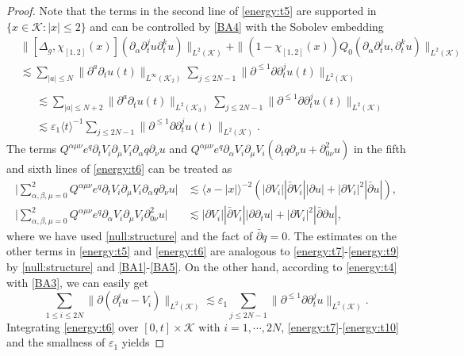 \documentclass[11pt,twoside]{article}
\def\cK{\mathcal K}
\def\p{\partial}
\def\ve{\varepsilon}
\def\ls{\lesssim}
\newcommand{\w}[1]{\langle {#1} \rangle}
\theoremstyle{plain}
\theoremstyle{definition}
\numberwithin{equation}{section}
\begin{document}
\begin{proof}
Note that the terms in the second line of \eqref{energy:t5} are supported in $\{x\in\cK:|x|\le2\}$ and
can be controlled by \eqref{BA4} with the Sobolev embedding
\begin{equation*}\label{energy:t8}
\begin{split}
&\|[\Delta_g,\chi_{[1,2]}(x)](\p_{\alpha}\p_t^ju\p_t^ku)\|_{L^2(\cK)}+\|(1-\chi_{[1,2]}(x))Q_0(\p_{\alpha}\p_t^ju,\p_t^ku)\|_{L^2(\cK)}\\
&\ls\sum_{|a|\le N}\|\p^a\p_tu(t)\|_{L^\infty(\cK_2)}\sum_{j\le2N-1}\|\p^{\le1}\p\p_t^ju(t)\|_{L^2(\cK)}\\
\end{split}
\end{equation*}
\begin{equation}\label{energy:t8}
\begin{split}
&\ls\sum_{|a|\le N+2}\|\p^a\p_tu(t)\|_{L^2(\cK_3)}\sum_{j\le2N-1}\|\p^{\le1}\p\p_t^ju(t)\|_{L^2(\cK)}\\
&\ls\ve_1\w{t}^{-1}\sum_{j\le2N-1}\|\p^{\le1}\p\p_t^ju(t)\|_{L^2(\cK)}.
\end{split}
\end{equation}
The terms $Q^{\alpha\mu\nu}e^q\p_tV_i\p_{\mu}V_i\p_{\alpha}q\p_{\nu}u$ and
$Q^{\alpha\mu\nu}e^q\p_{\alpha}V_i\p_{\mu}V_i(\p_tq\p_{\nu}u+\p^2_{0\nu}u)$ in the fifth and
sixth lines of \eqref{energy:t6} can be treated as
\begin{equation}\label{energy:t9}
\begin{split}
\Big|\sum_{\alpha,\beta,\mu=0}^2Q^{\alpha\mu\nu}e^q\p_tV_i\p_{\mu}V_i\p_{\alpha}q\p_{\nu}u\Big|
&\ls\w{s-|x|}^{-2}(|\p V_i||\bar\p V_i||\p u|+|\p V_i|^2|\bar\p u|),\\
\Big|\sum_{\alpha,\beta,\mu=0}^2Q^{\alpha\mu\nu}e^q\p_{\alpha}V_i\p_{\mu}V_i\p^2_{0\nu}u\Big|
&\ls|\p V_i||\bar\p V_i||\p\p_tu|+|\p V_i|^2|\bar\p\p u|,
\end{split}
\end{equation}
where we have used \eqref{null:structure} and the fact of $\bar\p q=0$.
The estimates on the other terms in \eqref{energy:t5} and \eqref{energy:t6} are analogous to \eqref{energy:t7}-\eqref{energy:t9} by \eqref{null:structure} and \eqref{BA1}-\eqref{BA5}.
On the other hand, according to \eqref{energy:t4} with \eqref{BA3}, we can easily get
\begin{equation}\label{energy:t10}
\sum_{1\le i\le2N}\|\p(\p_t^iu-V_i)\|_{L^2(\cK)}\ls\ve_1\sum_{j\le2N-1}\|\p^{\le1}\p\p_t^ju\|_{L^2(\cK)}.
\end{equation}
Integrating \eqref{energy:t6} over $[0,t]\times\cK$ with $i=1,\cdots,2N$, \eqref{energy:t7}-\eqref{energy:t10} and the smallness of $\ve_1$ yields

\end{proof}
\end{document}
